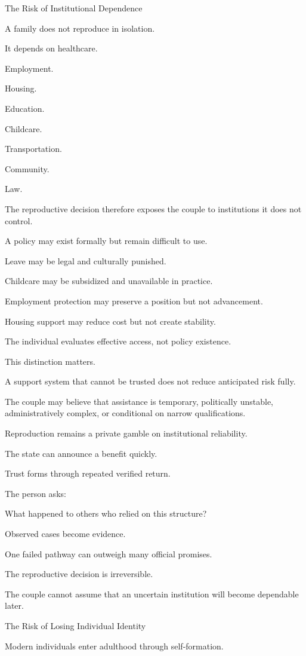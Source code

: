 The Risk of Institutional Dependence

A family does not reproduce in isolation.

It depends on healthcare.

Employment.

Housing.

Education.

Childcare.

Transportation.

Community.

Law.

The reproductive decision therefore exposes the couple to institutions it does not control.

A policy may exist formally but remain difficult to use.

Leave may be legal and culturally punished.

Childcare may be subsidized and unavailable in practice.

Employment protection may preserve a position but not advancement.

Housing support may reduce cost but not create stability.

The individual evaluates effective access, not policy existence.

This distinction matters.

A support system that cannot be trusted does not reduce anticipated risk fully.

The couple may believe that assistance is temporary, politically unstable, administratively complex, or conditional on narrow qualifications.

Reproduction remains a private gamble on institutional reliability.

The state can announce a benefit quickly.

Trust forms through repeated verified return.

The person asks:

What happened to others who relied on this structure?

Observed cases become evidence.

One failed pathway can outweigh many official promises.

The reproductive decision is irreversible.

The couple cannot assume that an uncertain institution will become dependable later.

The Risk of Losing Individual Identity

Modern individuals enter adulthood through self-formation.

